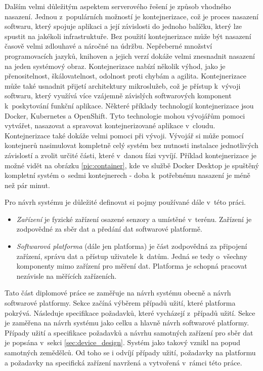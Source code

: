 Dalším velmi důležitým aspektem serverového řešení je způsob vhodného nasazení. Jednou z~populárních možností je kontejnerizace, což je proces nasazení softwaru, který spojuje aplikaci a její závislosti do jednoho balíčku, který lze spustit na jakékoli infrastruktuře. Bez použití kontejnerizace může být nasazení časově velmi zdlouhavé a náročné na údržbu. Nepřeberné množství programovacích jazyků, knihoven a jejich verzí dokáže velmi znesnadnit nasazení na jeden systémový obraz. Kontejnerizace nabízí několik výhod, jako je přenositelnost, škálovatelnost, odolnost proti chybám a agilita. Kontejnerizace může také usnadnit přijetí architektury mikroslužeb, což je přístup k~vývoji softwaru, který využívá více vzájemně závislých softwarových komponent k~poskytování funkční aplikace. Některé příklady technologií kontejnerizace jsou Docker, Kubernetes a OpenShift. Tyto technologie mohou vývojářům pomoci vytvářet, nasazovat a spravovat kontejnerizované aplikace v~cloudu. Kontejnerizace také dokáže velmi pomoci při vývoji. Vývojář si může pomocí kontejnerů nasimulovat kompletně celý systém bez nutnosti instalace jednotlivých závislostí a zvolit určité části, které v~danou fázi vyvíjí. Příklad kontejnerizace je možné vidět na obrázku \ref{pic:container}, kde ve službě Docker Desktop je spuštěný kompletní systém o~sedmi kontejnerech - doba k~potřebnému nasazení je méně než pár minut. \cite{CONTAINERIZATION}


\label{sec:system_design}
Pro návrh systému je důležité definovat si pojmy používané dále v~této práci.
\begin{itemize}
    \item \textit{Zařízení} je fyzické zařízení osazené senzory a umístěné v~terénu. Zařízení je zodpovědné za sběr dat a předání dat softwarové platformě.
    \item \textit{Softwarová platforma} (dále jen platforma) je část zodpovědná za připojení zařízení, správu dat a přístup uživatele k~datům. Jedná se tedy o~všechny komponenty mimo zařízení pro měření dat. Platforma je schopná pracovat nezávisle na měřících zařízeních.
\end{itemize}
Tato část diplomové práce se zaměřuje na návrh systému obecně a návrh softwarové platformy. Sekce začíná výběrem případů užití, které platforma pokrývá. Následuje specifikace požadavků, které vycházejí z~případů užití. Sekce je zaměřena na návrh systému jako celku a hlavně návrh softwarové platformy. Případy užití a specifikace požadavků a návrhu samotných zařízení pro sběr dat je popsána v~sekci \ref{sec:device_design}.
Systém jako takový vznikl na popud samotných zemědělců. Od toho se i odvíjí případy užití, požadavky na platformu a požadavky na specifická zařízení navržená a vytvořená v~rámci této práce. 

